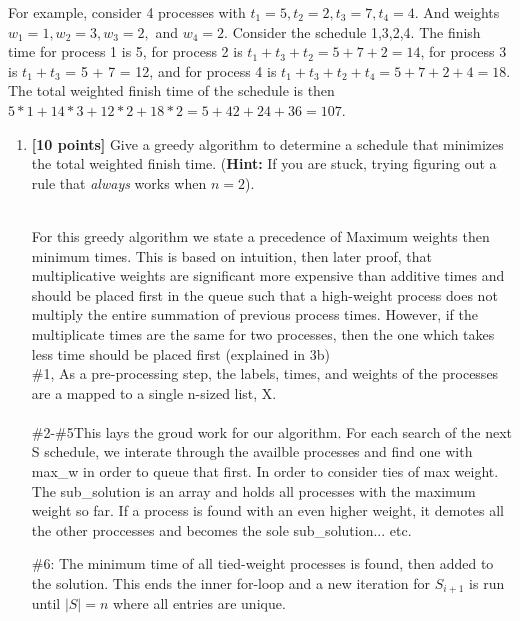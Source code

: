 \documentclass[11pt]{article}
\theoremstyle{definition}
\theoremstyle{theorem}
\newcommand{\solution}{\medskip\noindent{\color{DarkBlue}\textbf{Solution:}}}
\begin{document}
For example, consider 4 processes with $t_1 = 5, t_2 = 2, t_3 = 7, t_4 = 4$. And weights $w_1 = 1, w_2 = 3, w_3 = 2,$ and $w_4 = 2$. Consider the schedule 1,3,2,4. The ﬁnish time for process 1 is 5, for process 2 is $t_1 + t_3 + t_2 = 5 + 7 + 2 = 14$, for process 3 is $t_1 + t_3$ = 5 + 7 = 12, and for process 4 is $t_1 + t_3 + t_2 + t_4 = 5 + 7 + 2 + 4 = 18$. The total weighted ﬁnish time of the schedule is then $5*1 + 14*3 + 12*2 + 18*2 = 5 + 42 + 24 + 36 = 107$. 




\begin{enumerate}[label=(\alph*)]

\item \textbf{[10 points]} Give a greedy algorithm to determine a schedule that minimizes the total weighted ﬁnish time. (\textbf{Hint: } If you are stuck, trying figuring out a rule that \emph{always} works when $n=2$).

\solution \\ 

 

For this greedy algorithm we state a precedence of Maximum weights then minimum times.
 This is based on intuition, then later proof, that multiplicative weights are significant 
more expensive than additive times and should be placed first in the queue such that a high-weight process does not multiply the entire summation of previous process times.
However, if the multiplicate times are the same for two processes, then the one which takes less time should be placed first (explained in 3b)\\

\#1, As a pre-processing step, the labels, times, and weights of the processes are a mapped to a single n-sized list, X.
\\\\ \#2-\#5This lays the groud work for our algorithm. For each search of the next S schedule, we interate through the availble 
processes and find one with max\_w in order to queue that first. In order to consider ties of max weight. 
The sub\_solution is an array and holds all processes with the maximum weight so far.
If a process is found with an even higher weight, it demotes all the other proccesses and becomes the sole sub\_solution... etc.

\#6: The minimum time of all tied-weight processes is found, then added to the solution. This ends the inner for-loop and 
a new iteration for $S_{i+1}$ is run until $|S| = n$ where all entries are unique.



\end{enumerate}
\end{document}
